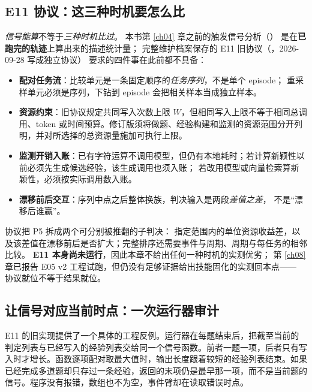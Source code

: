 \subsection{E11 协议：这三种时机要怎么比}
\label{sec:ch13-e11}

\begin{sloppypar}
\emph{信号能算}不等于\emph{三种时机比过}。
本书第 \ref{ch04} 章之前的触发信号分析（）
是在\textbf{已跑完的轨迹}上算出来的描述统计量；
完整维护档案保存的 E11 旧协议（，2026-09-28 写成独立协议）
要求的四件事在此前都不具备：
\end{sloppypar}

\begin{itemize}
  \item \textbf{配对任务流}：比较单元是一条固定顺序的\emph{任务序列}，不是单个 episode；
        重采样单元必须是序列，下钻到 episode 会把相关样本当成独立样本。
  \item \textbf{资源约束}：旧协议规定共同写入次数上限 $W$，但相同写入上限不等于相同总调用、token 或时间预算。修订版须将做题、经验构建和监测的资源范围分开列明，并对所选择的总资源量施加可执行上限。
  \item \textbf{监测开销入账}：已有字符运算不调用模型，但仍有本地耗时；若计算新颖性以前必须先生成候选经验，该生成调用也须入账；
        若改用模型或向量检索算新颖性，必须按实际调用数入账。
  \item \textbf{漂移前后交互}：序列中点之后整体换族，判决输入是两段\emph{差值之差}，
        不是“漂移后谁赢”。
\end{itemize}

\begin{sloppypar}
协议把 P5 拆成两个可分别被推翻的子判决：
指定范围内的单位资源收益差，以及该差值在漂移前后是否扩大；完整排序还需要事件与周期、周期与每任务的相邻比较。
\textbf{E11 本身尚未运行}，因此本章不给出任何一种时机的实测优劣；
第 \ref{ch08} 章已报告 E05 v2 工程试跑，但仍没有足够证据给出技能固化的实测回本点——
协议就位不等于结果就位。
\end{sloppypar}


\subsection{让信号对应当前时点：一次运行器审计}

E11 的旧实现提供了一个具体的工程反例。运行器在每题结束后，把截至当前的判定列表与已经写入的经验列表交给同一个信号函数。前者一题一项，后者只有写入时才增长。函数逐项配对取最大值时，输出长度跟着较短的经验列表结束。如果已经完成多道题却只存过一条经验，返回的末项仍是最早那一项，而不是当前题的信号。程序没有报错，数组也不为空，事件臂却在读取错误时点。

